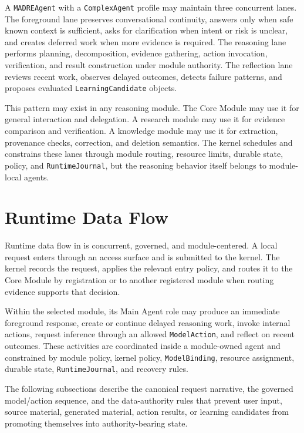A \texttt{MADREAgent} with a \texttt{ComplexAgent} profile may maintain three concurrent lanes. The foreground lane preserves conversational continuity, answers only when safe known context is sufficient, asks for clarification when intent or risk is unclear, and creates deferred work when more evidence is required. The reasoning lane performs planning, decomposition, evidence gathering, action invocation, verification, and result construction under module authority. The reflection lane reviews recent work, observes delayed outcomes, detects failure patterns, and proposes evaluated \texttt{LearningCandidate} objects.

This pattern may exist in any reasoning module. The Core Module may use it for general interaction and delegation. A research module may use it for evidence comparison and verification. A knowledge module may use it for extraction, provenance checks, correction, and deletion semantics. The kernel schedules and constrains these lanes through module routing, resource limits, durable state, policy, and \texttt{RuntimeJournal}, but the reasoning behavior itself belongs to module-local agents.

\section{Runtime Data Flow}

Runtime data flow in \Madre is concurrent, governed, and module-centered. A local request enters through an access surface and is submitted to the kernel. The kernel records the request, applies the relevant entry policy, and routes it to the Core Module by registration or to another registered module when routing evidence supports that decision.

Within the selected module, its Main Agent role may produce an immediate foreground response, create or continue delayed reasoning work, invoke internal actions, request inference through an allowed \texttt{ModelAction}, and reflect on recent outcomes. These activities are coordinated inside a module-owned agent and constrained by module policy, kernel policy, \texttt{ModelBinding}, resource assignment, durable state, \texttt{RuntimeJournal}, and recovery rules.

The following subsections describe the canonical request narrative, the governed model/action sequence, and the data-authority rules that prevent user input, source material, generated material, action results, or learning candidates from promoting themselves into authority-bearing state.

